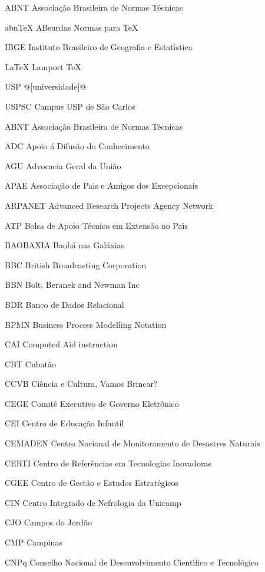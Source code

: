 \begin{siglas}
    \item[ABNT] Associa\c{c}\~ao Brasileira de Normas T\'ecnicas
    \item[abnTeX] ABsurdas Normas para TeX
	\item[IBGE] Instituto Brasileiro de Geografia e Estat\'{\i}stica
	\item[LaTeX] Lamport TeX
	\item[USP] @[universidade]@
	\item[USPSC] Campus USP de S\~ao Carlos
\item[ABNT] Associa\c{c}\~ao Brasileira de Normas T\'ecnicas
\item[ADC] Apoio \'a Difus\~ao do Conhecimento
\item[AGU] Advocacia Geral da Uni\~ao
\item[APAE] Associa\c{c}\~ao de Pais e Amigos dos Excepcionais 
\item[ARPANET] Advanced Research Projects Agency Network
\item[ATP] Bolsa de Apoio T\'ecnico em Extens\~ao no Pa\'{\i}s  
\item[BAOBAXIA] Baob\'a nas Gal\'axias
\item[BBC] British Broadcasting Corporation
\item[BBN] Bolt, Beranek and Newman Inc
\item[BDR] Banco de Dados Relacional	
\item[BPMN] Business Process Modelling Notation
\item[CAI] Computed Aid instruction
\item[CBT] Cubat\~ao
\item[CCVB] Ci\^encia e Cultura, Vamos Brincar?
\item[CEGE] Comit\^e Executivo de Governo Eletr\^onico
\item[CEI] Centro de Educa\c{c}\~ao Infantil
\item[CEMADEN] Centro Nacional de Monitoramento de Desastres Naturais
\item[CERTI] Centro de Refer\^encias em Tecnologias Inovadoras
\item[CGEE] Centro de Gest\~ao e Estudos Estrat\'egicos
\item[CIN] Centro Integrado de Nefrologia da Unicamp
\item[CJO] Campos do Jord\~ao
\item[CMP] Campinas
\item[CNPq] Conselho Nacional de Desenvolvimento Cient\'{\i}fico e Tecnol\'ogico

\end{siglas}
